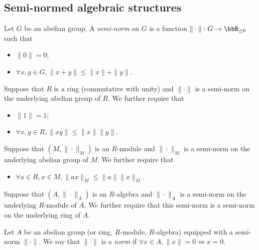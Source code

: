 
\subsection{Semi-normed algebraic structures}

    \begin{definition}\label{def:semi-normed_abelian_group_rings_modules_and_algebras}
        Let \(G\) be an abelian group.
        A \emph{semi-norm} on \(G\) is a function \(\|\cdot\|: G \to \bbR_{\geq 0}\) such that
        \begin{itemize}
            \item \(\|0\| = 0\);
            \item \(\forall x,y \in G, \|x + y\| \leq \|x\| + \|y\|\).
        \end{itemize}
        Suppose that \(R\) is a ring (commutative with unity) and \(\|\cdot\|\) is a semi-norm on the underlying abelian group of \(R\).
        We further require that
        \begin{itemize}
            \item \(\|1\| = 1\);
            \item \(\forall x,y \in R, \|xy\| \leq \|x\|\|y\|\).
        \end{itemize}
        Suppose that \((M,\|\cdot\|_M)\) is an \(R\)-module and \(\|\cdot\|_M\) is a semi-norm on the underlying abelian group of \(M\).
        We further require that 
        \begin{itemize}
            \item \(\forall a \in R, x \in M, \|ax\|_M \leq \|a\| \|x\|_M\).
        \end{itemize}
        Suppose that \((A, \|\cdot\|_A)\) is an \(R\)-algebra and \(\|\cdot\|_A\) is a semi-norm on the underlying \(R\)-module of \(A\).
        We further require that this semi-norm is a semi-norm on the underlying ring of \(A\).
    \end{definition}

    \begin{definition}\label{def:normed_group_rings_modules_and_algebras}
        Let \(A\) be an abelian group (or ring, \(R\)-module, \(R\)-algebra) equipped with a semi-norm \(\|\cdot\|\).
        We say that \(\|\cdot\|\) is a \emph{norm} if \(\forall x \in A, \|x\| = 0 \iff x = 0\).
    \end{definition}

